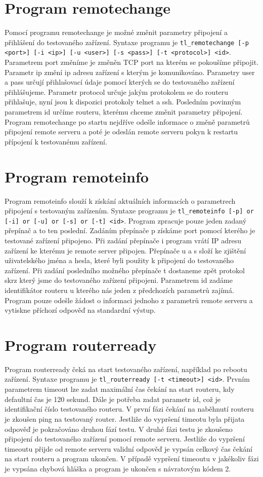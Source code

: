 \section{Program remotechange}
Pomocí programu remotechange je možné změnit parametry připojení a přihlášení do testovaného zařízení. Syntaxe programu je \texttt{tl\_remotechange [-p <port>] [-i <ip>] [-u <user>] [-s <pass>] [-t <protocol>] <id>}. Parametrem port změníme je změněn TCP port na kterém se pokoušíme připojit. Parametr ip změní ip adresu zařízení s kterým je komunikováno. Parametry user a pass určují přihlašovací údaje pomocí kterých se do testovaného zařízení přihlášujeme. Parametr protocol určuje jakým protokolem se do routeru přihlašuje, nyní jsou k dispozici protokoly telnet a ssh. Posledním povinným parametrem id určíme routeru, kterému chceme změnit parametry připojení. Program remotechange po startu nejdříve odešle informace o změně parametrů připojení remote serveru a poté je odeslán remote serveru pokyn k restartu přípojení k testovanému zařízení. 

\section{Program remoteinfo}
Program remoteinfo slouží k získání aktuálních informacích o parametrech připojení s testovaným zařízením. Syntaxe programu je \texttt{tl\_remoteinfo [-p] or [-i] or [-u] or [-s] or [-t] <id>}. Program zpracuje pouze jeden zadaný přepínač a to ten poslední. Zadáním přepínače p získáme port pomocí kterého je testované zařízení připojeno. Při zadání přepínače i program vrátí IP adresu zařízení ke kterému je remote server připojen. Přepínače u a s složí ke zjištění uživatelského jména a hesla, které byli použity k připojení do testovaného zařízení. Při zadání posledního možného přepínače t dostaneme zpět protokol skrz který jsme do testovaného zařízení připojeni. Parametrem id zadáme identifikátor routeru u kterého nás jeden z předchozích parametrů zajímá. Program pouze odešle žádost o informaci jednoho z parametrů remote serveru a vytiskne příchozí odpověď na standardní výstup.

\section{Program routerready}
Program routerready čeká na start testovaného zařízení, například po rebootu zařízení. Syntaxe programu je \texttt{tl\_routerready [-t <timeout>]  <id>}. Prvním parametrem timeout lze zadat maximální čas čekání na start routeru, kdy defaultní čas je 120 sekund. Dále je potřeba zadat parametr id, což je identifikační číslo testovaného routeru. V první fázi čekání na naběhnutí routeru je zkoušen ping na testovaný router. Jestliže do vypršení timeotu byla přijata odpověď je pokračováno druhou fází testu. V druhé fázi testu je zkoušeno připojení do testovaného zařízení pomocí remote serveru. Jestliže do vypršení timeoutu přijde od remote serveru validní odpověď je vypsán celkový čas čekání na start routeru a program ukončen. V případě vypršení timeoutu v jakékoliv fázi je vypsána chybová hláška a program je ukončen s návratovým kódem 2.

